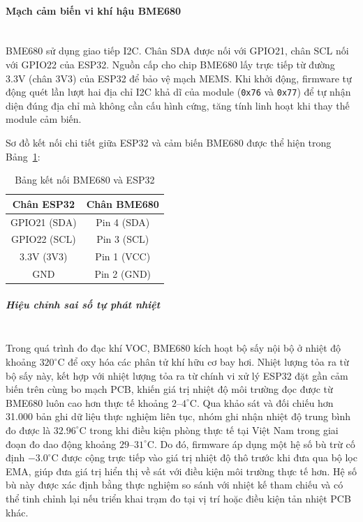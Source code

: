 \documentclass[12pt,a4paper]{article}
\begin{document}
\paragraph{Mạch cảm biến vi khí hậu BME680}\mbox{}\\
BME680 sử dụng giao tiếp I2C. Chân SDA được nối với GPIO21, chân SCL nối với GPIO22 của ESP32. Nguồn cấp cho chip BME680 lấy trực tiếp từ đường 3.3V (chân 3V3) của ESP32 để bảo vệ mạch MEMS. Khi khởi động, firmware tự động quét lần lượt hai địa chỉ I2C khả dĩ của module (\texttt{0x76} và \texttt{0x77}) để tự nhận diện đúng địa chỉ mà không cần cấu hình cứng, tăng tính linh hoạt khi thay thế module cảm biến.

Sơ đồ kết nối chi tiết giữa ESP32 và cảm biến BME680 được thể hiện trong Bảng~\ref{tab:schematic_bme680}:

\begin{table}[H]
    \centering
    \begin{tabular}{|c|c|}
        \hline
        \textbf{Chân ESP32} & \textbf{Chân BME680} \\
        \hline
        GPIO21 (SDA) & Pin 4 (SDA) \\
        \hline
        GPIO22 (SCL) & Pin 3 (SCL) \\
        \hline
        3.3V (3V3) & Pin 1 (VCC) \\
        \hline
        GND & Pin 2 (GND) \\
        \hline
    \end{tabular}
    \caption{Bảng kết nối BME680 và ESP32}
    \label{tab:schematic_bme680}
\end{table}

\subparagraph{Hiệu chỉnh sai số tự phát nhiệt}\mbox{}\\
Trong quá trình đo đạc khí VOC, BME680 kích hoạt bộ sấy nội bộ ở nhiệt độ khoảng $320^\circ$C để oxy hóa các phân tử khí hữu cơ bay hơi. Nhiệt lượng tỏa ra từ bộ sấy này, kết hợp với nhiệt lượng tỏa ra từ chính vi xử lý ESP32 đặt gần cảm biến trên cùng bo mạch PCB, khiến giá trị nhiệt độ môi trường đọc được từ BME680 luôn cao hơn thực tế khoảng $2$--$4^\circ$C. Qua khảo sát và đối chiếu hơn 31.000 bản ghi dữ liệu thực nghiệm liên tục, nhóm ghi nhận nhiệt độ trung bình đo được là $32.96^\circ$C trong khi điều kiện phòng thực tế tại Việt Nam trong giai đoạn đo dao động khoảng $29$--$31^\circ$C. Do đó, firmware áp dụng một hệ số bù trừ cố định $-3.0^\circ$C được cộng trực tiếp vào giá trị nhiệt độ thô trước khi đưa qua bộ lọc EMA, giúp đưa giá trị hiển thị về sát với điều kiện môi trường thực tế hơn. Hệ số bù này được xác định bằng thực nghiệm so sánh với nhiệt kế tham chiếu và có thể tinh chỉnh lại nếu triển khai trạm đo tại vị trí hoặc điều kiện tản nhiệt PCB khác.
\end{document}
